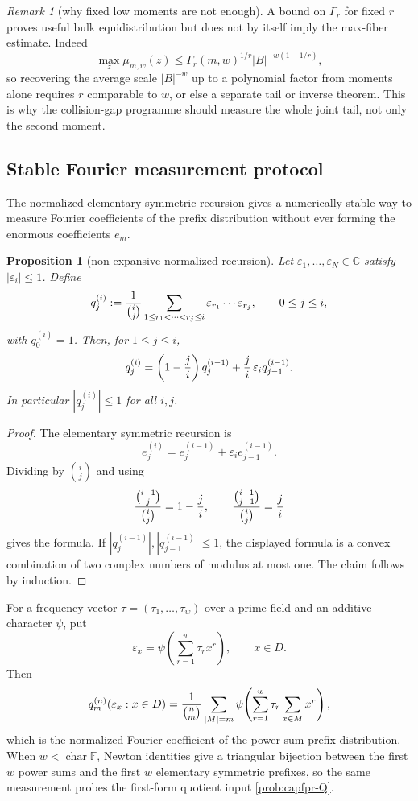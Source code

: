 \documentclass[11pt]{article}
\newtheorem{proposition}[proposition]{Proposition}
\theoremstyle{definition}
\theoremstyle{remark}
\newtheorem{remark}[remark]{Remark}
\newcommand{\F}{\mathbb{F}}
\newcommand{\B}{B}
\begin{document}
\begin{remark}[why fixed low moments are not enough]\label{rem:capfpr-low-moments}
A bound on $\Gamma_r$ for fixed $r$ proves useful bulk equidistribution but does not by itself imply the max-fiber estimate.  Indeed
\[
        \max_z\mu_{m,w}(z)
        \le \Gamma_r(m,w)^{1/r}|\B|^{-w(1-1/r)},
\]
so recovering the average scale $|\B|^{-w}$ up to a polynomial factor from moments alone requires $r$ comparable to $w$, or else a separate tail or inverse theorem.  This is why the collision-gap programme should measure the whole joint tail, not only the second moment.
\end{remark}

\subsection{Stable Fourier measurement protocol}\label{subsec:capfpr-normalized-recursion}

The normalized elementary-symmetric recursion gives a numerically stable way to measure Fourier coefficients of the prefix distribution without ever forming the enormous coefficients $e_m$.

\begin{proposition}[non-expansive normalized recursion]\label{prop:capfpr-normalized-recursion}
Let $\varepsilon_1,\ldots,\varepsilon_N\in\mathbb C$ satisfy $|\varepsilon_i|\le1$.  Define
\[
        q_j^{(i)}
        := {1\over \binom i j}
           \sum_{1\le r_1<\cdots<r_j\le i}
           \varepsilon_{r_1}\cdots\varepsilon_{r_j},
        \qquad 0\le j\le i,
\]
with $q_0^{(i)}=1$.  Then, for $1\le j\le i$,
\[
        q_j^{(i)}=
        \left(1-{j\over i}\right)q_j^{(i-1)}
        +{j\over i}\,\varepsilon_i q_{j-1}^{(i-1)}.
\]
In particular $|q_j^{(i)}|\le1$ for all $i,j$.
\end{proposition}

\begin{proof}
The elementary symmetric recursion is
\[
        e_j^{(i)}=e_j^{(i-1)}+\varepsilon_i e_{j-1}^{(i-1)}.
\]
Dividing by $\binom i j$ and using
\[
        {\binom {i-1}j\over\binom ij}=1-{j\over i},
        \qquad
        {\binom {i-1}{j-1}\over\binom ij}={j\over i}
\]
gives the formula.  If $|q_j^{(i-1)}|,|q_{j-1}^{(i-1)}|\le1$, the displayed formula is a convex combination of two complex numbers of modulus at most one.  The claim follows by induction.
\end{proof}

For a frequency vector $\tau=(\tau_1,\ldots,\tau_w)$ over a prime field and an additive character $\psi$, put
\[
        \varepsilon_x=\psi\!\left(\sum_{r=1}^{w}\tau_r x^r\right),
        \qquad x\in D.
\]
Then
\[
        q_m^{(n)}(\varepsilon_x:x\in D)
        ={1\over\binom n m}\sum_{|M|=m}\psi\!\left(\sum_{r=1}^{w}\tau_r\sum_{x\in M}x^r\right),
\]
which is the normalized Fourier coefficient of the power-sum prefix distribution.  When $w<\operatorname{char}\F$, Newton identities give a triangular bijection between the first $w$ power sums and the first $w$ elementary symmetric prefixes, so the same measurement probes the first-form quotient input \cref{prob:capfpr-Q}.
\end{document}
